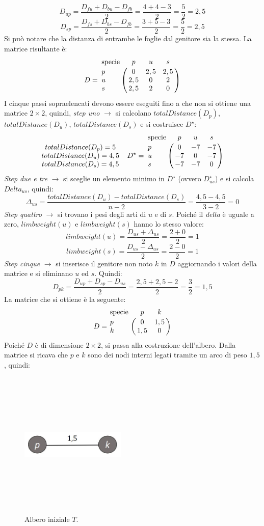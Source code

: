 \[D_{up}=\frac{D_{fu}+D_{bu}-D_{fb}}{2}=\frac{4+4-3}{2}=\frac{5}{2}=2,5\]
\[D_{sp}=\frac{D_{fs}+D_{bs}-D_{fb}}{2}=\frac{3+5-3}{2}=\frac{5}{2}=2,5\]
Si può notare che la distanza di entrambe le foglie dal genitore sia la stessa. La matrice risultante è:
\[
D = \bordermatrix{\text{specie}&p&u&s\cr
                p& 0 & 2,5 & 2,5\cr
                u& 2,5 & 0 & 2\cr
                s& 2,5 & 2 & 0}
\]
I cinque passi sopraelencati devono essere eseguiti fino a che non si ottiene una matrice $2 \times 2$, quindi, \textit{step uno} $\rightarrow$ si calcolano $totalDistance(D_p)$,\newline $totalDistance(D_u)$, $totalDistance(D_s)$ e si costruisce $D^\star$:
\[
\begin{matrix}
totalDistance(D_p)=5\\ 
totalDistance(D_u)=4,5\\ 
totalDistance(D_s)=4,5
\end{matrix}\;\;\;\;
D^\star = \bordermatrix{\text{specie}&p&u&s\cr
                p& 0 & -7 & -7\cr
                u& -7 & 0 & -7\cr
                s& -7 & -7 & 0}
\]
\textit{Step due e tre} $\rightarrow$ si sceglie un elemento minimo in $D^\star$ (ovvero $D^\star_{us}$) e si calcola $Delta_{us}$, quindi:
\[\Delta_{us}=\frac{totalDistance(D_u)-totalDistance(D_s)}{n-2}=\frac{4,5-4,5}{3-2}=0\]
\textit{Step quattro} $\rightarrow$ si trovano i pesi degli arti di $u$ e di $s$. Poiché il \textit{delta} è uguale a zero, $limbweight(u)$ e $limbweight(s)$ hanno lo stesso valore:
\[limbweight(u)=\frac{D_{us}+\Delta_{us}}{2}=\frac{2+0}{2}=1\]
\[limbweight(s)=\frac{D_{us}-\Delta_{us}}{2}=\frac{2-0}{2}=1\]
\textit{Step cinque} $\rightarrow$ si inserisce il genitore non noto $k$ in $D$ aggiornando i valori della matrice e si eliminano $u$ ed $s$. Quindi:
\[D_{pk}=\frac{D_{up}+D_{sp}-D_{us}}{2}=\frac{2,5+2,5-2}{2}=\frac{3}{2}=1,5\]
La matrice che si ottiene è la seguente:
\[
D = \bordermatrix{\text{specie}&p&k\cr
                p& 0 & 1,5\cr
                k& 1,5 & 0}
\]
Poiché $D$ è di dimensione $2 \times 2$, si passa alla costruzione dell'albero.  Dalla matrice si ricava che $p$ e $k$ sono dei nodi interni legati tramite un arco di peso $1,5$, quindi:
\begin{figure}[h!]
\centering
	\includegraphics[height=7cm, width=5cm, keepaspectratio]{neighbor_joining_1.jpg}
 	\caption{Albero iniziale $T$.}
  	\label{fig:neighbor_joining_1}
\end{figure}
